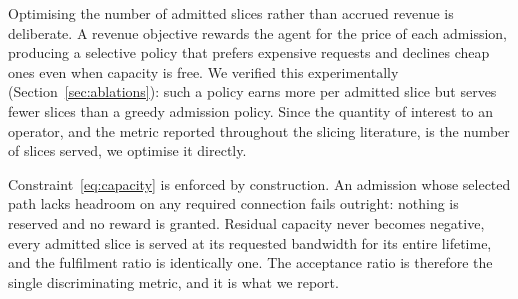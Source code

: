 \documentclass[10pt,journal,comsoc]{IEEEtran}
\begin{document}
Optimising the number of admitted slices rather than accrued revenue is
deliberate. A revenue objective rewards the agent for the price of each
admission, producing a selective policy that prefers expensive requests
and declines cheap ones even when capacity is free. We verified this
experimentally (Section~\ref{sec:ablations}): such a policy earns more per
admitted slice but serves fewer slices than a greedy admission policy.
Since the quantity of interest to an operator, and the metric reported
throughout the slicing literature, is the number of slices served, we
optimise it directly.

Constraint~\eqref{eq:capacity} is enforced by construction. An admission
whose selected path lacks headroom on any required connection fails
outright: nothing is reserved and no reward is granted. Residual capacity
never becomes negative, every admitted slice is served at its requested
bandwidth for its entire lifetime, and the fulfilment ratio is identically
one. The acceptance ratio is therefore the single discriminating metric,
and it is what we report.
\end{document}
